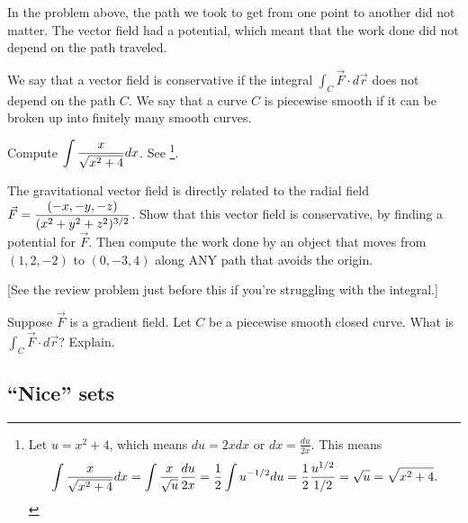 In the problem above, the path we took to get from one point to another did not matter. The vector field had a potential, which meant that the work done did not depend on the path traveled. 
\begin{definition}
 We say that a vector field is conservative if the integral $\int_C \vec F\cdot d\vec r$ does not depend on the path $C$. We say that a curve $C$ is piecewise smooth if it can be broken up into finitely many smooth curves.
\end{definition}
 
\begin{review*}
 Compute $\displaystyle \int \frac{x}{\sqrt{x^2+4}}dx$. See \footnote{
Let $u=x^2+4$, which means $du=2xdx$ or $dx=\frac{du}{2x}$.  This means
$$\displaystyle \int \frac{x}{\sqrt{x^2+4}}dx 
= \int \frac{x}{\sqrt{u}}\frac{du}{2x} 
= \frac{1}{2}\int u^{-1/2}du
= \frac{1}{2}\frac{u^{1/2}}{1/2}
= \sqrt{u} = \sqrt{x^2+4}.
$$
}.
\end{review*}


\begin{problem}
 The gravitational vector field is directly related to the radial field $\displaystyle\vec F = \frac{\left(-x,-y,-z\right)}{(x^2+y^2+z^2)^{3/2}}$. Show that this vector field is conservative, by finding a potential for $\vec F$.  Then compute the work done by an object that moves from $(1,2,-2)$ to $(0,-3,4)$ along ANY path that avoids the origin. 

[See the review problem just before this if you're struggling with the integral.]
\end{problem}


\begin{problem}
 Suppose $\vec F$ is a gradient field.  Let $C$ be a piecewise smooth closed curve. What is $\int_C \vec F\cdot d\vec r$? Explain.
\end{problem}


\subsection{``Nice'' sets}
\label{sec:nice-sets}



